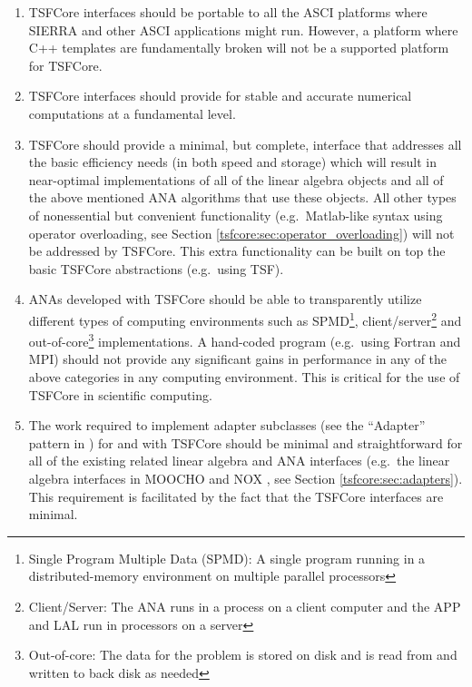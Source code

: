 \begin{enumerate}

\item
TSFCore interfaces should be portable to all the ASCI
\cite{ref:doe_asci} platforms where SIERRA
\cite{ref:SIERRA} and other ASCI applications might run.  However, a
platform where C++ templates are fundamentally broken will not be a
supported platform for TSFCore.

\item
TSFCore interfaces should provide for stable and accurate numerical
computations at a fundamental level.

\item
TSFCore should provide a minimal, but complete, interface that
addresses all the basic efficiency needs (in both speed and storage)
which will result in near-optimal implementations of all of the linear
algebra objects and all of the above mentioned ANA algorithms that use
these objects.  All other types of nonessential but convenient
functionality (e.g.~Matlab-like syntax using operator overloading, see
Section \ref{tsfcore:sec:operator_overloading}) will not be addressed
by TSFCore.  This extra functionality can be built on top the basic
TSFCore abstractions (e.g.~using TSF).

\item
ANAs developed with TSFCore should be able to transparently utilize
different types of computing environments such as SPMD\footnote{Single
Program Multiple Data (SPMD): A single program running in a
distributed-memory environment on multiple parallel processors},
client/server\footnote{Client/Server: The ANA runs in a process on a
client computer and the APP and LAL run in processors on a server} and
out-of-core\footnote{Out-of-core: The data for the problem is stored
on disk and is read from and written to back disk as needed}
implementations.  A hand-coded program (e.g.~using Fortran and MPI)
should not provide any significant gains in performance in any of the
above categories in any computing environment.  This is critical for
the use of TSFCore in scientific computing.

\item
The work required to implement adapter subclasses (see the ``Adapter''
pattern in \cite{ref:gama_et_al_1995}) for and with TSFCore should be
minimal and straightforward for all of the existing related linear
algebra and ANA interfaces (e.g.~the linear algebra interfaces in
MOOCHO \cite{ref:moochouserguide} and NOX \cite{ref:nox}, see
Section \ref{tsfcore:sec:adapters}).  This requirement is facilitated
by the fact that the TSFCore interfaces are minimal.

\end{enumerate}

